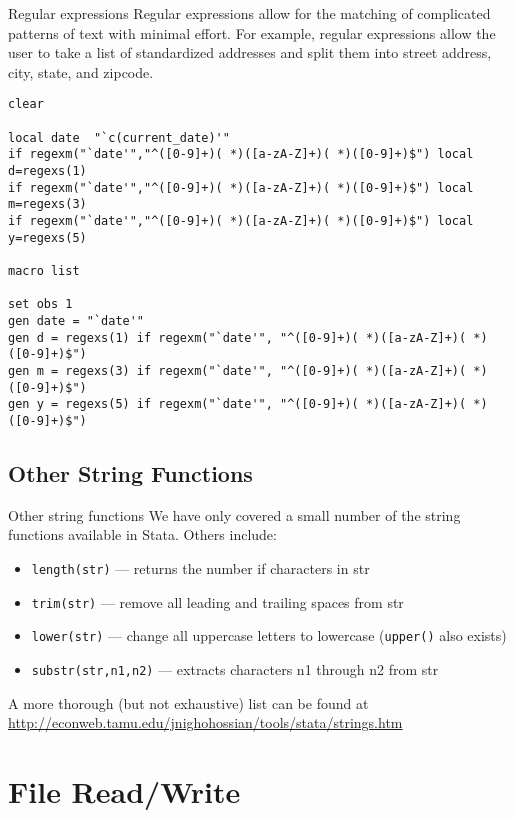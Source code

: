 \documentclass[fleqn, handout, 10pt]{beamer}
\def\lst{\lstinline}
\begin{document}
\begin{frame}[fragile]{Regular expressions}
    Regular expressions allow for the matching of complicated patterns of text with minimal effort. For example, regular expressions allow the user to take a list of standardized addresses and split them into street address, city, state, and zipcode.
    \begin{lstlisting}
clear

local date  "`c(current_date)'"
if regexm("`date'","^([0-9]+)( *)([a-zA-Z]+)( *)([0-9]+)$") local d=regexs(1)
if regexm("`date'","^([0-9]+)( *)([a-zA-Z]+)( *)([0-9]+)$") local m=regexs(3)
if regexm("`date'","^([0-9]+)( *)([a-zA-Z]+)( *)([0-9]+)$") local y=regexs(5)

macro list

set obs 1
gen date = "`date'"
gen d = regexs(1) if regexm("`date'", "^([0-9]+)( *)([a-zA-Z]+)( *)([0-9]+)$")
gen m = regexs(3) if regexm("`date'", "^([0-9]+)( *)([a-zA-Z]+)( *)([0-9]+)$")
gen y = regexs(5) if regexm("`date'", "^([0-9]+)( *)([a-zA-Z]+)( *)([0-9]+)$")
    \end{lstlisting}
\end{frame}


\subsection{Other String Functions}

\begin{frame}[fragile]{Other string functions}
    We have only covered a small number of the string functions available in Stata. Others include:
    \begin{itemize}
        \item \lst=length(str)= --- returns the number if characters in str
        \item \lst=trim(str)= --- remove all leading and trailing spaces from str
        \item \lst=lower(str)= --- change all uppercase letters to lowercase (\lst=upper()= also exists)
        \item \lst=substr(str,n1,n2)= --- extracts characters n1 through n2 from str
    \end{itemize}
    A more thorough (but not exhaustive) list can be found at \url{http://econweb.tamu.edu/jnighohossian/tools/stata/strings.htm}
\end{frame}

\section{File Read/Write}
\end{document}
